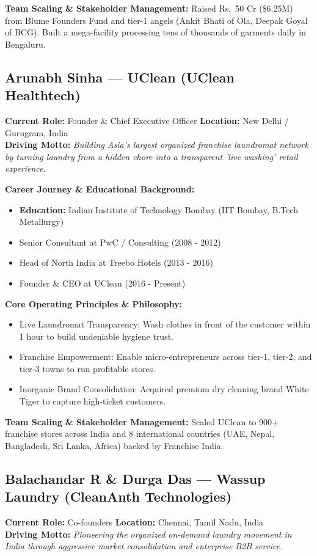 \documentclass[11pt,a4paper]{article}
\begin{document}
\textbf{Team Scaling \& Stakeholder Management:} Raised Rs.~50 Cr (\$6.25M) from Blume Founders Fund and tier-1 angels (Ankit Bhati of Ola, Deepak Goyal of BCG). Built a mega-facility processing tens of thousands of garments daily in Bengaluru.

\subsection{Arunabh Sinha --- UClean (UClean Healthtech)}
\textbf{Current Role:} Founder \& Chief Executive Officer \quad \textbf{Location:} New Delhi / Gurugram, India\\
\textbf{Driving Motto:} \textit{Building Asia's largest organized franchise laundromat network by turning laundry from a hidden chore into a transparent 'live washing' retail experience.}

\textbf{Career Journey \& Educational Background:}
\begin{itemize}[leftmargin=*]
    \item \textbf{Education:} Indian Institute of Technology Bombay (IIT Bombay, B.Tech Metallurgy)
    \item Senior Consultant at PwC / Consulting (2008 - 2012)
    \item Head of North India at Treebo Hotels (2013 - 2016)
    \item Founder \& CEO at UClean (2016 - Present)
\end{itemize}

\textbf{Core Operating Principles \& Philosophy:}
\begin{itemize}[leftmargin=*]
    \item Live Laundromat Transparency: Wash clothes in front of the customer within 1 hour to build undeniable hygiene trust.
    \item Franchise Empowerment: Enable micro-entrepreneurs across tier-1, tier-2, and tier-3 towns to run profitable stores.
    \item Inorganic Brand Consolidation: Acquired premium dry cleaning brand White Tiger to capture high-ticket customers.
\end{itemize}

\textbf{Team Scaling \& Stakeholder Management:} Scaled UClean to 900+ franchise stores across India and 8 international countries (UAE, Nepal, Bangladesh, Sri Lanka, Africa) backed by Franchise India.

\subsection{Balachandar R \& Durga Das --- Wassup Laundry (CleanAnth Technologies)}
\textbf{Current Role:} Co-founders \quad \textbf{Location:} Chennai, Tamil Nadu, India\\
\textbf{Driving Motto:} \textit{Pioneering the organized on-demand laundry movement in India through aggressive market consolidation and enterprise B2B service.}
\end{document}
